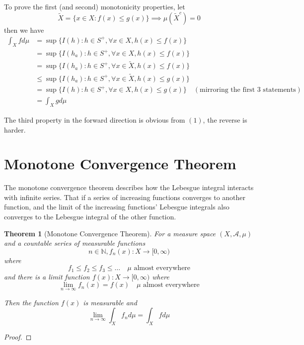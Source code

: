 \documentclass{article}
\newtheorem{theorem}{Theorem}[section]
\begin{document}
To prove the first (and second) monotonicity properties, let
\[
    \tilde X = \{x \in X \colon f(x) \leq g(x)\} \implies \mu(\tilde X^c) = 0
\]
then we have
\begin{align*}
    \int_X f d\mu &= \sup \{I(h) \colon h \in S^+, \forall x \in X, h(x) \leq f(x)\}\\
    &= \sup \{I(h_a) \colon h \in S^+, \forall x \in X, h(x) \leq f(x)\}\\
    &= \sup \{I(h_a) \colon h \in S^+, \forall x \in \tilde X, h(x) \leq f(x)\}\\
    &\leq \sup \{I(h_a) \colon h \in S^+, \forall x \in \tilde X, h(x) \leq g(x)\}\\
    &= \sup \{I(h) \colon h \in S^+, \forall x \in X, h(x) \leq g(x)\} \quad (\text{mirroring the first 3 statements})\\
    &= \int_X g d\mu
\end{align*}

The third property in the forward direction is obvious from $(1)$, the reverse is harder.

\newpage
\section{Monotone Convergence Theorem}
The monotone convergence theorem describes how the Lebesgue integral interacts with infinite series. That if a series of increasing functions converges to another function, and the limit of the increasing functions' Lebesgue integrals also converges to the Lebesgue integral of the other function.

\begin{theorem}[Monotone Convergence Theorem]
    For a measure space $(X, \mathcal A, \mu)$ and a countable series of measurable functions
    \[
        n \in \mathbb{N}, f_n(x) \colon X \to [0, \infty)
    \]
    where
    \[
        f_1 \leq f_2 \leq f_3 \leq \dots \quad \text{$\mu$ almost everywhere}
    \]
    and there is a limit function $f(x) \colon X \to [0, \infty)$ where
    \[
        \lim_{n \to \infty} f_n(x) = f(x) \quad \text{$\mu$ almost everywhere}
    \]

    Then the function $f(x)$ is measurable and
    \[
        \lim_{n\to \infty} \int_X f_n d\mu = \int_X f d\mu
    \]
\end{theorem}
\begin{proof}

\end{proof}
\end{document}
